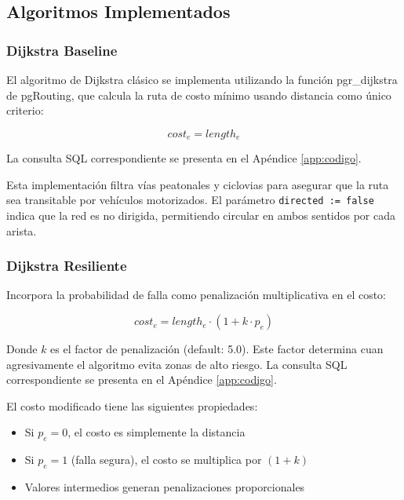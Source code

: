 \documentclass[conference]{IEEEtran}
\begin{document}
\subsection{Algoritmos Implementados}

\subsubsection{Dijkstra Baseline}

El algoritmo de Dijkstra clásico se implementa utilizando la función pgr\_dijkstra de pgRouting, que calcula la ruta de costo mínimo usando distancia como único criterio:

\begin{equation}
cost_e = length_e
\end{equation}

La consulta SQL correspondiente se presenta en el Apéndice \ref{app:codigo}.

Esta implementación filtra vías peatonales y ciclovias para asegurar que la ruta sea transitable por vehículos motorizados. El parámetro \texttt{directed := false} indica que la red es no dirigida, permitiendo circular en ambos sentidos por cada arista.

\subsubsection{Dijkstra Resiliente}

Incorpora la probabilidad de falla como penalización multiplicativa en el costo:

\begin{equation}
cost_e = length_e \cdot (1 + k \cdot p_e)
\end{equation}

Donde $k$ es el factor de penalización (default: 5.0). Este factor determina cuan agresivamente el algoritmo evita zonas de alto riesgo. La consulta SQL correspondiente se presenta en el Apéndice \ref{app:codigo}.

El costo modificado tiene las siguientes propiedades:
\begin{itemize}
    \item Si $p_e = 0$, el costo es simplemente la distancia
    \item Si $p_e = 1$ (falla segura), el costo se multiplica por $(1 + k)$
    \item Valores intermedios generan penalizaciones proporcionales
\end{itemize}
\end{document}
